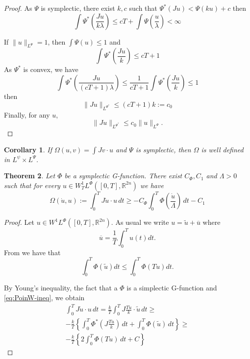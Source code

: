 \documentclass[twoside]{article}
\newtheorem{thm}{Theorem}[section]
\newtheorem{cor}[thm]{Corollary}
\theoremstyle{remark}
\newcommand{\rr}{\mathbb{R}}
\renewcommand{\leq}{\leqslant}
\renewcommand{\geq}{\geqslant}
\begin{document}
\begin{proof}
As $\Psi$ is symplectic, there exist $k,c$ such that
$
\Psi^*(Ju)<\Psi(ku)+c
$
then 
\[
\int \Psi^*\left(\frac{Ju}{k \lambda}\right) \leq cT+\int \Psi\left(\frac{u}{\lambda}\right)<\infty
\]

If $\|u\|_{L^{\Psi}}=1$, then $\int \Psi(u)\leq 1$ and
\[
\int \Psi^*\left(\frac{Ju}{k}\right) \leq cT+1 
\]
As $\Psi^*$ is convex, we have 
\[
\int \Psi^*\left(\frac{Ju}{(cT+1) \lambda}\right) 
\leq \frac{1}{cT+1} \int \Psi^*\left(\frac{Ju}{k}\right)\leq 1
\]
then 
\[
\|Ju \|_{L^{\Psi^*}}\leq (cT+1)k:=c_0
\]
Finally, for any $u$, 
\[
\|Ju\|_{L^{\Psi^*}}\leq c_0\|u\|_{L^{\Psi}}.
\]
\end{proof}



\begin{cor}
If $
\Omega(u,v)=\int J v\cdot u
$
and $\Psi$ is symplectic, then $\Omega$ is well defined in $L^{\psi} \times L^{\Psi}$.
\end{cor}







\begin{thm}
Let $\Phi$ be a symplectic G-function. 
There exist  $C_{\Phi},C_1$ and $\Lambda>0$ such that for every $u \in W_T^1L^{\Phi}([0,T],\rr^{2n})$
we have
\begin{equation}\label{eq:cotaJu}
\Omega(\dot{u},u):=\int_0^T J\dot{u}\cdot u\,dt\geq -C_{\Phi}\int_0^T \Phi\left(\frac{\dot{u}}{\Lambda}\right)\,dt-C_1
\end{equation}
\end{thm}


\begin{proof}
Let  $u\in W^1L^{\Phi}([0,T],\rr^{2n})$. As usual we write $u=\tilde{u}+\overline{u}$ where
 \[\overline{u}=\frac{1}{T}\int_0^Tu(t)dt.\]
 From \cite[Lem. 2.4]{MA2017} we have that
\begin{equation}\label{eq:PoinW-ineq}
\int_0^T\Phi(\tilde{u})dt\leq\int_0^T\Phi(T\dot{u})dt.
 \end{equation}

By Young's inequality, the fact that a $\Phi$ is a simplectic G-function and \eqref{eq:PoinW-ineq}, we obtain
\[
\begin{split}
\int_0^T J\dot{u} \cdot u \,dt=\frac{k}{T}\int_0^T J\frac{T\dot{u}}{k}\cdot \tilde{u} \,dt\geq 
\\
-\frac{k}{T}\left\{\int_0^T \Phi^* \left(J\frac{T\dot{u}}{k}\right) \,dt+\int_0^T \Phi(\tilde{u}) \,dt\right\}\geq
\\
-\frac{k}{T}\left\{ 2\int_0^T \Phi(T\dot{u})\,dt+C\right\}
\end{split}
\]
\end{proof}
\end{document}
